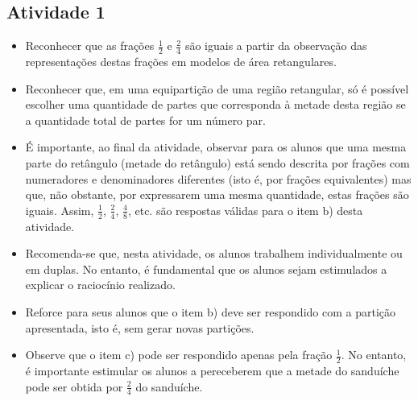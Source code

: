 \begin{multicols}{2}



\subsection{Atividade 1}

\begin{itemize} %
    \item       Reconhecer que as frações       $\frac{1}{2}$       e
$\frac{2}{4}$       são iguais a partir da observação das representações destas
frações em modelos de área retangulares.
    \item       Reconhecer que, em uma equipartição de uma região retangular, só
é possível escolher uma quantidade de partes que corresponda à metade desta
região se a quantidade total de partes for um número par.
    \item       É importante, ao final da atividade, observar para os alunos que
uma mesma parte do retângulo (metade do retângulo) está sendo descrita por
frações com numeradores e denominadores diferentes (isto é, por frações
equivalentes) mas que, não obstante, por expressarem uma mesma quantidade, estas
frações são iguais. Assim,       $\frac{1}{2}$,       $\frac{2}{4}$,
$\frac{4}{8}$, etc. são respostas válidas para o item b) desta atividade.
\end{itemize} %




\begin{itemize} %
    \item       Recomenda-se que, nesta atividade, os alunos trabalhem
individualmente ou em duplas. No entanto, é fundamental que os alunos sejam
estimulados a explicar o raciocínio realizado.
    \item       Reforce para seus alunos que o item b) deve ser respondido com a
partição apresentada, isto é, sem gerar novas partições.
    \item       Observe que o item c) pode ser respondido apenas pela fração
  $\frac{1}{2}$. No entanto, é importante estimular os alunos a pereceberem que
a metade do sanduíche pode ser obtida por       $\frac{2}{4}$       do
sanduíche.
\end{itemize} %


  \vspace{.1cm}


\end{multicols}
